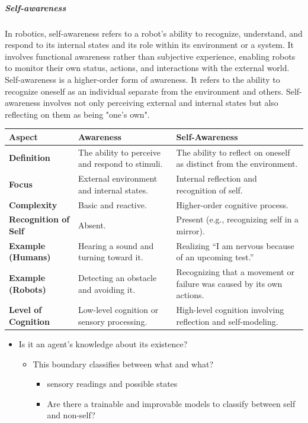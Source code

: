 \documentclass{book}
\begin{document}
\subparagraph{Self-awareness}
In robotics, self-awareness refers to a robot's ability to recognize, understand, and respond to its internal states and its role within its environment or a system. It involves functional awareness rather than subjective experience, enabling robots to monitor their own status, actions, and interactions with the external world. Self-awareness is a higher-order form of awareness. It refers to the ability to recognize oneself as an individual separate from the environment and others. Self-awareness involves not only perceiving external and internal states but also reflecting on them as being "one's own".
\begin{tabular}{|l|l|l|}
    \hline
    \textbf{Aspect}              & \textbf{Awareness}                              & \textbf{Self-Awareness}                                               \\ \hline
    \textbf{Definition}          & The ability to perceive and respond to stimuli. & The ability to reflect on oneself as distinct from the environment.   \\ \hline
    \textbf{Focus}               & External environment and internal states.       & Internal reflection and recognition of self.                          \\ \hline
    \textbf{Complexity}          & Basic and reactive.                             & Higher-order cognitive process.                                       \\ \hline
    \textbf{Recognition of Self} & Absent.                                         & Present (e.g., recognizing self in a mirror).                         \\ \hline
    \textbf{Example (Humans)}    & Hearing a sound and turning toward it.          & Realizing “I am nervous because of an upcoming test.”                 \\ \hline
    \textbf{Example (Robots)}    & Detecting an obstacle and avoiding it.          & Recognizing that a movement or failure was caused by its own actions. \\ \hline
    \textbf{Level of Cognition}  & Low-level cognition or sensory processing.      & High-level cognition involving reflection and self-modeling.          \\ \hline
\end{tabular}
\begin{itemize}
    \item Is it an agent's knowledge about its existence?

    \begin{itemize}
        \item This boundary classifies between what and what?
        \begin{itemize}
            \item sensory readings and possible states
            \item Are there a trainable and improvable models to classify between self and non-self?
        \end{itemize}
    \end{itemize}
\end{itemize}
\end{document}
